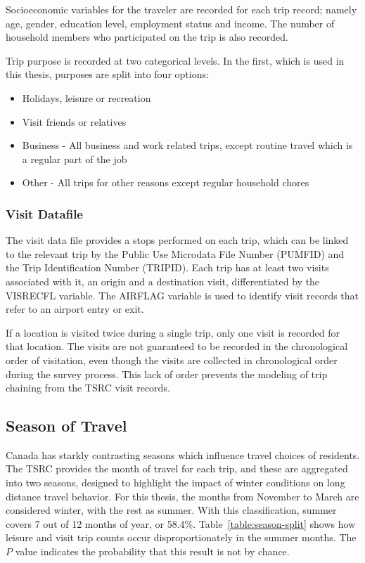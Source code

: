 Socioeconomic variables for the traveler are recorded for each trip record; namely age, gender, education level, employment status and income. The number of household members who participated on the trip is also recorded.

Trip purpose is  recorded at two categorical levels. In the first, which is used in this thesis, purposes are split into four options:
\begin{itemize}
\item Holidays, leisure or recreation
\item Visit friends or relatives
\item Business - All business and work related trips, except routine travel which is a regular part of the job
\item Other - All trips for other reasons except regular household chores
\end{itemize}

\subsubsection*{Visit Datafile}
The visit data file provides a stops performed on each trip, which can be linked to the relevant trip by the Public Use Microdata File Number (PUMFID) and the Trip Identification Number (TRIPID). Each trip has at least two visits associated with it, an origin and a destination visit, differentiated by the VISRECFL variable. The AIRFLAG variable is used to identify visit records that refer to an airport entry or exit. 

If a location is visited twice during a single trip, only one visit is recorded for that location. The visits are not guaranteed to be recorded in the chronological order of visitation, even though the visits are collected in chronological order during the survey process. This lack of order prevents the modeling of trip chaining from the TSRC visit records.

\subsection{Season of Travel}
Canada has starkly contrasting seasons which influence travel choices of residents. The TSRC provides the month of travel for each trip, and these are aggregated into two seasons, designed to highlight the impact of winter conditions on long distance travel behavior. For this thesis, the months from November to March are considered winter, with the rest as summer. With this classification, summer covers 7 out of 12 months of year, or 58.4\%. Table~\ref{table:season-split} shows how leisure and visit trip counts occur disproportionately in the summer months. The $P$ value indicates the probability that this result is not by chance.

